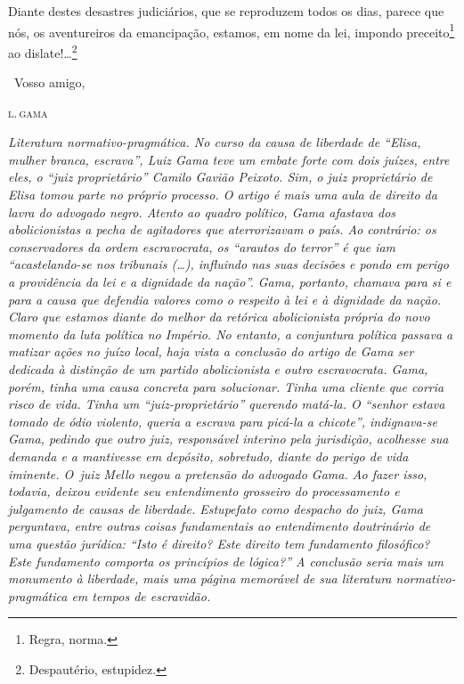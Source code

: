 Diante destes desastres judiciários, que se reproduzem todos os dias,
parece que nós, os aventureiros da emancipação, estamos, em nome da lei,
impondo preceito\footnote{Regra, norma.} ao dislate!\ldots{}\footnote{
  Despautério, estupidez.}

\medskip

\hfill\ Vosso amigo,

\hfill\textsc{l.\,gama}


\begin{resumo}
\emph{Literatura normativo-pragmática. No curso da causa de liberdade de
``Elisa, mulher branca, escrava'', Luiz Gama teve um embate forte com
dois juízes, entre eles, o ``juiz proprietário'' Camilo Gavião Peixoto.
Sim, o juiz proprietário de Elisa tomou parte no próprio processo. O
artigo é mais uma aula de direito da lavra do advogado negro. Atento ao
quadro político, Gama afastava dos abolicionistas a pecha de agitadores
que aterrorizavam o país. Ao contrário: os conservadores da ordem
escravocrata, os ``arautos do terror'' é que iam ``acastelando-se nos
tribunais (\ldots{}), influindo nas suas decisões e pondo em perigo a
providência da lei e a dignidade da nação''. Gama, portanto, chamava para
si e para a causa que defendia valores como o respeito à lei e à
dignidade da nação. Claro que estamos diante do melhor da retórica
abolicionista própria do novo momento da luta política no Império. No
entanto, a conjuntura política passava a matizar ações no juízo local,
haja vista a conclusão do artigo de Gama ser dedicada à distinção de um
partido abolicionista e outro escravocrata. Gama, porém, tinha uma causa
concreta para solucionar. Tinha uma cliente que corria risco de vida.
Tinha um ``juiz-proprietário'' querendo matá-la. O ``senhor estava tomado
de ódio violento, queria a escrava para picá-la a chicote'', indignava-se
Gama, pedindo que outro juiz, responsável interino pela jurisdição,
acolhesse sua demanda e a mantivesse em depósito, sobretudo, diante do
perigo de vida iminente. O~juiz Mello negou a pretensão do advogado
Gama. Ao fazer isso, todavia, deixou evidente seu entendimento grosseiro
do processamento e julgamento de causas de liberdade. Estupefato como
despacho do juiz, Gama perguntava, entre outras coisas fundamentais ao
entendimento doutrinário de uma questão jurídica: ``Isto é direito? Este
direito tem fundamento filosófico? Este fundamento comporta os
princípios de lógica?'' A conclusão seria mais um monumento à liberdade,
mais uma página memorável de sua literatura normativo-pragmática em
tempos de escravidão.}
\end{resumo}

